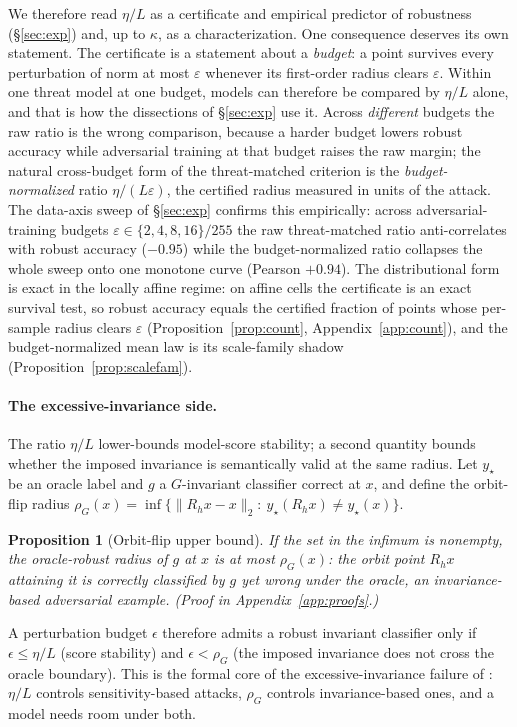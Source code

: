 \documentclass{article}
\newtheorem{proposition}{Proposition}
\theoremstyle{definition}
\begin{document}
We therefore read $\eta/L$ as a certificate and empirical predictor of robustness (\S\ref{sec:exp}) and, up to $\kappa$, as a characterization. One consequence deserves its own statement. The certificate is a statement about a \emph{budget}: a point survives every perturbation of norm at most $\varepsilon$ whenever its first-order radius clears $\varepsilon$. Within one threat model at one budget, models can therefore be compared by $\eta/L$ alone, and that is how the dissections of \S\ref{sec:exp} use it. Across \emph{different} budgets the raw ratio is the wrong comparison, because a harder budget lowers robust accuracy while adversarial training at that budget raises the raw margin; the natural cross-budget form of the threat-matched criterion is the \emph{budget-normalized} ratio $\eta/(L\varepsilon)$, the certified radius measured in units of the attack. The data-axis sweep of \S\ref{sec:exp} confirms this empirically: across adversarial-training budgets $\varepsilon\in\{2,4,8,16\}/255$ the raw threat-matched ratio anti-correlates with robust accuracy ($-0.95$) while the budget-normalized ratio collapses the whole sweep onto one monotone curve (Pearson $+0.94$). The distributional form is exact in the locally affine regime: on affine cells the certificate is an exact survival test, so robust accuracy equals the certified fraction of points whose per-sample radius clears $\varepsilon$ (Proposition~\ref{prop:count}, Appendix~\ref{app:count}), and the budget-normalized mean law is its scale-family shadow (Proposition~\ref{prop:scalefam}).

\paragraph{The excessive-invariance side.} The ratio $\eta/L$ lower-bounds model-score stability; a second quantity bounds whether the imposed invariance is semantically valid at the same radius. Let $y_\star$ be an oracle label and $g$ a $G$-invariant classifier correct at $x$, and define the orbit-flip radius $\rho_G(x)=\inf\{\|R_h x-x\|_2:\ y_\star(R_h x)\neq y_\star(x)\}$.
\begin{proposition}[Orbit-flip upper bound]\label{prop:rhoG}
If the set in the infimum is nonempty, the oracle-robust radius of $g$ at $x$ is at most $\rho_G(x)$: the orbit point $R_h x$ attaining it is correctly classified by $g$ yet wrong under the oracle, an invariance-based adversarial example. (Proof in Appendix~\ref{app:proofs}.)
\end{proposition}
A perturbation budget $\epsilon$ therefore admits a robust invariant classifier only if $\epsilon\le\eta/L$ (score stability) and $\epsilon<\rho_G$ (the imposed invariance does not cross the oracle boundary). This is the formal core of the excessive-invariance failure of \citet{tramer2020fundamental}: $\eta/L$ controls sensitivity-based attacks, $\rho_G$ controls invariance-based ones, and a model needs room under both.
\end{document}
